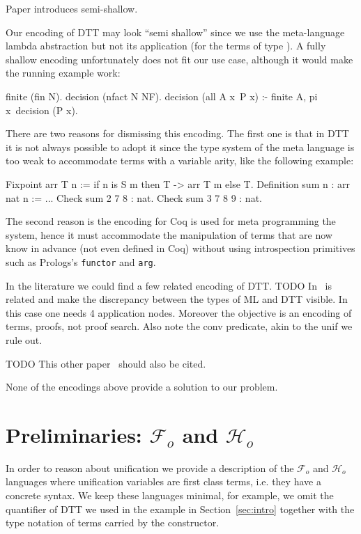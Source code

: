 \documentclass[sigconf,natbib=false,review]{acmart}
\newcommand{\Fo}{\ensuremath{\mathcal{F}_{\!o}\xspace}} %
\newcommand{\Ho}{\ensuremath{\mathcal{H}_o}\xspace}
\begin{document}
Paper \cite{10.1145/2966268.2966272} introduces semi-shallow.

Our encoding of DTT may look ``semi shallow'' since we use the meta-language
lambda abstraction but not its application (for the terms of type ).
A fully shallow encoding unfortunately does not fit our use case, although
it would make the running example work:

\begin{elpicode}
finite (fin N).
decision (nfact N NF).
decision (all A x\ P x) :- finite A, pi x\ decision (P x).
\end{elpicode}

\noindent
There are two reasons for dismissing this encoding. The first one is that
in DTT it is not always possible to adopt it since the type system
of the meta language is too weak to accommodate terms with a variable arity,
like the following example:

\begin{coqcode}
Fixpoint arr T n := if n is S m then T -> arr T m else T.
Definition sum n : arr nat n := ...
Check sum 2   7 8   : nat.
Check sum 3   7 8 9 : nat.
\end{coqcode}

\noindent
The second reason is the encoding for Coq is used for meta programming the
system, hence it must accommodate the manipulation of terms that are now
know in advance (not even defined in Coq) without using introspection
primitives such as Prologs's \texttt{functor} and \texttt{arg}.

In the literature we could find a few related encoding of DTT.
TODO In~\cite{felty93lics} is related and make the
discrepancy between the types of ML and DTT visible. In this case
one needs 4 application nodes. Moreover the objective is an encoding
of terms, proofs, not proof search. Also note the conv predicate,
akin to the unif we rule out.

TODO This other paper~\cite{10.1007/978-3-031-38499-8_25} should also be cited.

None of the encodings above provide a solution to our problem.

\section{Preliminaries: \Fo{} and \Ho}
\label{sec:lang-spec}

In order to reason about unification we provide a description of the
\Fo{} and \Ho languages where unification variables
are first class terms, i.e. they have a concrete syntax. We keep these languages
minimal, for example, we omit the  quantifier of DTT we used
in the example in Section~\ref{sec:intro} together with the type notation of
terms carried by the  constructor. 
%
\setlength{\abovecaptionskip}{0pt}
\setlength{\belowcaptionskip}{-13pt}
\end{document}
